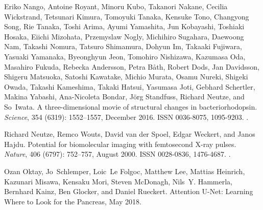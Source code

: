 \documentclass[a4paper]{article}
\begin{document}
\begin{thebibliography}{33}
Eriko Nango, Antoine Royant, Minoru Kubo, Takanori Nakane, Cecilia Wickstrand,
  Tetsunari Kimura, Tomoyuki Tanaka, Kensuke Tono, Changyong Song, Rie Tanaka,
  Toshi Arima, Ayumi Yamashita, Jun Kobayashi, Toshiaki Hosaka, Eiichi
  Mizohata, Przemyslaw Nogly, Michihiro Sugahara, Daewoong Nam, Takashi Nomura,
  Tatsuro Shimamura, Dohyun Im, Takaaki Fujiwara, Yasuaki Yamanaka, Byeonghyun
  Jeon, Tomohiro Nishizawa, Kazumasa Oda, Masahiro Fukuda, Rebecka Andersson,
  Petra B{\aa}th, Robert Dods, Jan Davidsson, Shigeru Matsuoka, Satoshi
  Kawatake, Michio Murata, Osamu Nureki, Shigeki Owada, Takashi Kameshima,
  Takaki Hatsui, Yasumasa Joti, Gebhard Schertler, Makina Yabashi, Ana-Nicoleta
  Bondar, J{\"o}rg Standfuss, Richard Neutze, and So~Iwata.
\newblock A three-dimensional movie of structural changes in bacteriorhodopsin.
\newblock \emph{Science}, 354 (6319): 1552--1557, December
  2016.
\newblock ISSN 0036-8075, 1095-9203.
\newblock {}.

Richard Neutze, Remco Wouts, David {van der Spoel}, Edgar Weckert, and Janos
  Hajdu.
\newblock Potential for biomolecular imaging with femtosecond {{X-ray}} pulses.
\newblock \emph{Nature}, 406 (6797): 752--757, August 2000.
\newblock ISSN 0028-0836, 1476-4687.
\newblock {}.

Ozan Oktay, Jo~Schlemper, Loic~Le Folgoc, Matthew Lee, Mattias Heinrich,
  Kazunari Misawa, Kensaku Mori, Steven McDonagh, Nils~Y. Hammerla, Bernhard
  Kainz, Ben Glocker, and Daniel Rueckert.
\newblock Attention {{U-Net}}: {{Learning Where}} to {{Look}} for the
  {{Pancreas}}, May 2018.


\end{thebibliography}
\end{document}
